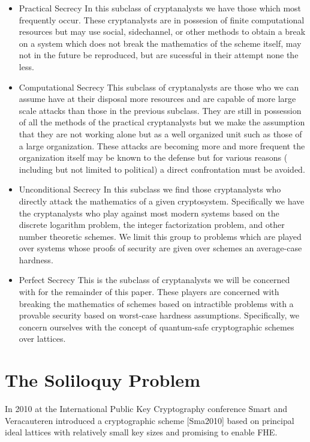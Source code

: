 \documentclass{article}
\begin{document}
\begin{itemize}
\item{Practical Secrecy} In this subclass of cryptanalysts we have those
which most frequently occur. These cryptanalysts are in possesion of
finite computational resources but may use social, sidechannel, or
other methods to obtain a break on a system which does not break the
mathematics of the scheme itself, may not in the future be reproduced,
but are sucessful in their attempt none the less.

\item{Computational Secrecy} This subclass of cryptanalysts are those who
we can assume have at their disposal more resources and are capable of
more large scale attacks than those in the previous subclass. They are
still in possession of all the methods of the practical cryptanalysts
but we make the assumption that they are not working alone but as a
well organized unit such as those of a large organization. These
attacks are becoming more and more frequent the organization itself may
be known to the defense but for various reasons ( including but not
limited to political) a direct confrontation must be avoided.

\item{Unconditional Secrecy} In this subclass we find those cryptanalysts
who directly attack the mathematics of a given cryptosystem.
Specifically we have the cryptanalysts who play against most modern
systems based on the discrete logarithm problem, the integer
factorization problem, and other number theoretic schemes. We limit
this group to problems which are played over systems whose proofs of
security are given over schemes an average-case hardness.

\item{Perfect Secrecy} This is the subclass of cryptanalysts we will be
concerned with for the remainder of this paper. These players are
concerned with breaking the mathematics of schemes based on intractible
problems with a provable security based on worst-case hardness
assumptions. Specifically, we concern ourselves with the concept of
quantum-safe cryptographic schemes over lattices.
\end{itemize}

\section{The Soliloquy Problem}

In 2010 at the International Public Key Cryptography conference Smart
and Veracauteren introduced a cryptographic scheme [Sma2010] based on
principal ideal lattices with relatively small key sizes and promising
to enable FHE.
\end{document}
